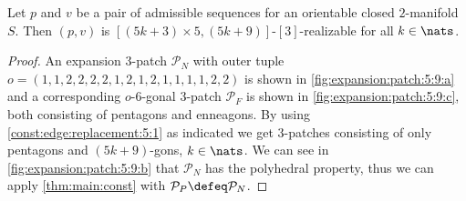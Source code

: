 \begin{theorem}
  Let $p$ and $v$ be a pair of admissible sequences for an orientable closed $2$-manifold $S$. Then $(p, v)$ is $[(5k + 3) \times 5, (5k+9)]$-$[3]$-realizable for all $k \in \nats$.
  \begin{proof}
    An expansion $3$-patch $\mathcal{P}_N$ with outer tuple $o = (1, 1, 2, 2, 2, 2, 1, 2, 1, 2, 1, 1, 1, 1, 2, 2)$ is shown in \autoref{fig:expansion:patch:5:9:a} and a corresponding $o$-$6$-gonal $3$-patch $\mathcal{P}_F$ is shown in \autoref{fig:expansion:patch:5:9:c}, both consisting of pentagons and enneagons. By using \autoref{const:edge:replacement:5:1} as indicated we get $3$-patches consisting of only pentagons and $(5k+9)$-gons, $k \in \nats$. We can see in \autoref{fig:expansion:patch:5:9:b} that $\mathcal{P}_N$ has the polyhedral property, thus we can apply \autoref{thm:main:const} with $\mathcal{P}_P \defeq \mathcal{P}_N$.
  \end{proof}
\end{theorem}
